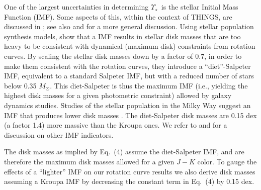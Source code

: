 \documentclass[usenatbib,usegraphicx,apjfonts,floatfix]{emulateapj}
\newcommand{\MLstar}{\ensuremath{\Upsilon_{\star}}}
\begin{document}
One of the largest uncertainties in determining \MLstar\ is the
stellar Initial Mass Function (IMF). Some aspects of this, within the
context of THINGS, are discussed in \citet{adam}; see also
\citet{bell_dejong} and \citet{bell03} for a more general discussion.
Using stellar population synthesis models, \citet{bell_dejong} show
that a \citet{salpeter} IMF results in stellar disk masses that are
too heavy to be consistent with dynamical (maximum disk) constraints
from rotation curves. By scaling the stellar disk masses down by a
factor of 0.7, in order to make them consistent with the rotation
curves, they introduce a ``diet''-Salpeter IMF, equivalent to a
standard Salpeter IMF, but with a reduced number of stars below 0.35
$M_{\odot}$. This diet-Salpeter is thus the maximum IMF (i.e.,
yielding the highest disk masses for a given photometric constraint)
allowed by galaxy dynamics studies.  Studies of the stellar population
in the Milky Way suggest an IMF that produces lower disk masses
\citep{kroupa}. The diet-Salpeter disk masses are 0.15 dex (a factor
1.4) more massive than the Kroupa ones.  We refer to \citet{adam} and
\citet{bell03} for a discussion on other IMF indicators.

The disk masses as implied by Eq.~(4) assume the diet-Salpeter IMF,
and are therefore the maximum disk masses allowed for a given $J-K$
color.  To gauge the effects of a ``lighter'' IMF on our rotation curve
results we also derive disk masses assuming a Kroupa IMF by decreasing
the constant term in Eq.~(4) by 0.15 dex.
\end{document}
